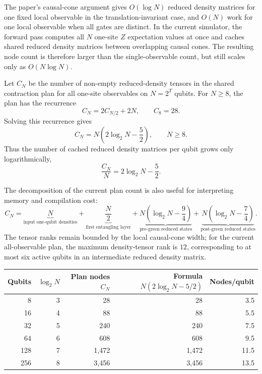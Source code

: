 \documentclass[11pt]{article}
\begin{document}
The paper's causal-cone argument gives \(O(\log N)\) reduced density matrices
for one fixed local observable in the translation-invariant case, and
\(O(N)\) work for one local observable when all gates are distinct. In the
current simulator, the forward pass computes all \(N\) one-site \(Z\)
expectation values at once and caches shared reduced density matrices between
overlapping causal cones. The resulting node count is therefore larger than the
single-observable count, but still scales only as \(O(N\log N)\).

Let \(C_N\) be the number of non-empty reduced-density tensors in the shared
contraction plan for all one-site observables on \(N=2^T\) qubits. For
\(N\ge 8\), the plan has the recurrence
\[
  C_N = 2 C_{N/2} + 2N,
  \qquad
  C_8 = 28.
\]
Solving this recurrence gives
\[
  C_N = N\left(2\log_2 N - \frac{5}{2}\right),
  \qquad N\ge 8.
\]
Thus the number of cached reduced density matrices per qubit grows only
logarithmically,
\[
  \frac{C_N}{N} = 2\log_2 N - \frac{5}{2}.
\]

The decomposition of the current plan count is also useful for interpreting
memory and compilation cost:
\[
  C_N
  =
  \underbrace{N}_{\text{input one-qubit densities}}
  +
  \underbrace{\frac{N}{2}}_{\text{first entangling layer}}
  +
  \underbrace{N\left(\log_2 N-\frac{9}{4}\right)}_{\text{pre-green reduced states}}
  +
  \underbrace{N\left(\log_2 N-\frac{7}{4}\right)}_{\text{post-green reduced states}}.
\]
The tensor ranks remain bounded by the local causal-cone width; for the current
all-observable plan, the maximum density-tensor rank is \(12\), corresponding to
at most six active qubits in an intermediate reduced density matrix.

\begin{table}[h]
\centering
\begin{tabular}{rrrrr}
\toprule
Qubits & \(\log_2 N\) & Plan nodes \(C_N\) & Formula \(N(2\log_2N-5/2)\) & Nodes/qubit \\
\midrule
8 & 3 & 28 & 28 & 3.5 \\
16 & 4 & 88 & 88 & 5.5 \\
32 & 5 & 240 & 240 & 7.5 \\
64 & 6 & 608 & 608 & 9.5 \\
128 & 7 & 1,472 & 1,472 & 11.5 \\
256 & 8 & 3,456 & 3,456 & 13.5 \\
\bottomrule
\end{tabular}
\end{table}
\end{document}
